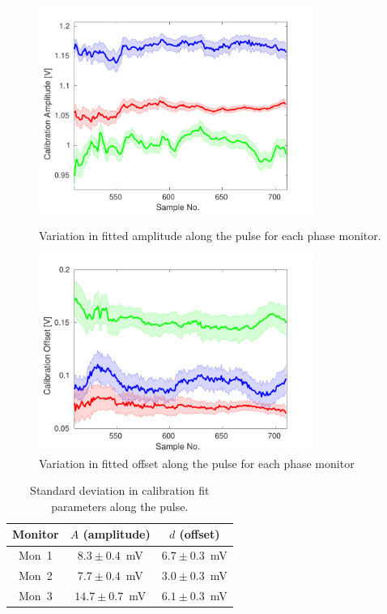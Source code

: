 \begin{figure}
  \centering
  \includegraphics[width=0.8\textwidth]{Figures/phaseMons/calAmpVsSample}
  \caption{Variation in fitted amplitude along the pulse for each phase monitor.}
  \label{f:calAmpVsSample}
  \centering
  \includegraphics[width=0.8\textwidth]{Figures/phaseMons/calOffVsSample}
  \caption{Variation in fitted offset along the pulse for each phase monitor}
  \label{f:calOffVsSample}
\end{figure}

\begin{table}
  \begin{center}
    \begin{tabular}{|c c c|}
	   \hline
       Monitor & \(A\) (amplitude) & \(d\) (offset) \\ \hline
       Mon~1 & \(8.3\pm0.4\)~mV & \(6.7\pm0.3\)~mV \\ 
       Mon~2 & \(7.7\pm0.4\)~mV & \(3.0\pm0.3\)~mV\\
       Mon~3 & \(14.7\pm0.7\)~mV & \(6.1\pm0.3\)~mV\\ \hline
    \end{tabular}
    \caption{Standard deviation in calibration fit parameters along the pulse.}
  	\label{t:calConstsStdAlong}
  \end{center}
\end{table}

